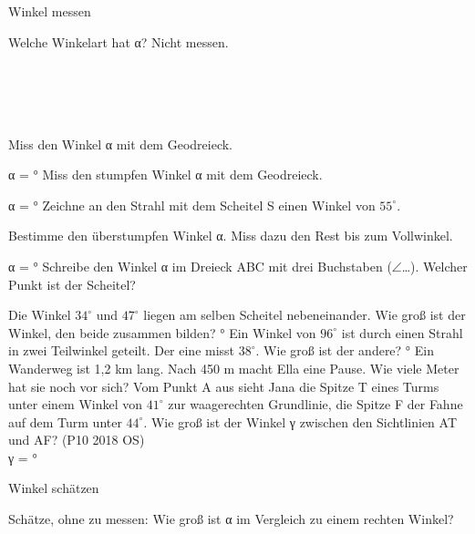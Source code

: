 \begin{aufgabe}{Winkel messen}
\begin{teile}
\teil Welche Winkelart hat α? Nicht messen. \\  \\  \\  \\  \\ 

\teil Miss den Winkel α mit dem Geodreieck.

α = \leerfeld °
\teil Miss den stumpfen Winkel α mit dem Geodreieck.

α = \leerfeld °
\teil Zeichne an den Strahl mit dem Scheitel S einen Winkel von $55^\circ$.

\winkelstrahl
\teil Bestimme den überstumpfen Winkel α. Miss dazu den Rest bis zum Vollwinkel.

α = \leerfeld °
\teil Schreibe den Winkel α im Dreieck ABC mit drei Buchstaben ($\angle$…). Welcher Punkt ist der Scheitel?

\teil Die Winkel $34^\circ$ und $47^\circ$ liegen am selben Scheitel nebeneinander. Wie groß ist der Winkel, den beide zusammen bilden? \leerfeld °
\teil Ein Winkel von $96^\circ$ ist durch einen Strahl in zwei Teilwinkel geteilt. Der eine misst $38^\circ$. Wie groß ist der andere? \leerfeld °
\teil Ein Wanderweg ist 1,2 km lang. Nach 450 m macht Ella eine Pause. Wie viele Meter hat sie noch vor sich? \leerfeld[m]
\teil Vom Punkt A aus sieht Jana die Spitze T eines Turms unter einem Winkel von $41^\circ$ zur waagerechten Grundlinie, die Spitze F der Fahne auf dem Turm unter $44^\circ$. Wie groß ist der Winkel γ zwischen den Sichtlinien AT und AF? \hfill (P10 2018 OS) \\ γ = \leerfeld °
\end{teile}
\end{aufgabe}

\begin{aufgabe}{Winkel schätzen}
\begin{teile}
\teil Schätze, ohne zu messen: Wie groß ist α im Vergleich zu einem rechten Winkel? \\  \\  \\ 

\end{teile}
\end{aufgabe}

